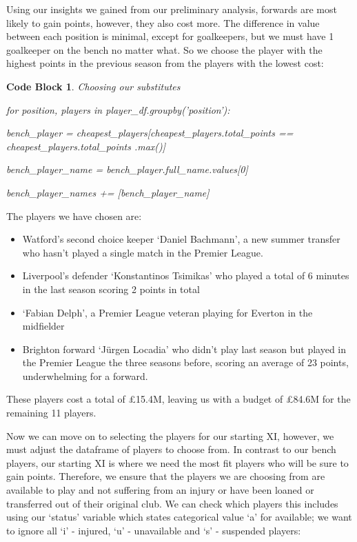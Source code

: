\documentclass[12pt, a4paper, oneside]{book}
\newtheorem{codeblock}[theorem]{Code Block}
\numberwithin{equation}{section}
\begin{document}
Using our insights we gained from our preliminary analysis, forwards are most likely to gain points, however, they also cost more. The difference in value between each position is minimal, except for goalkeepers, but we must have 1 goalkeeper on the bench no matter what. So we choose the player with the highest points in the previous season from the players with the lowest cost:

\begin{codeblock}
  Choosing our substitutes

  for position, players in player\_df.groupby('position'):

  bench\_player = cheapest\_players[cheapest\_players.total\_points == cheapest\_players.total\_points .max()]
  
  bench\_player\_name = bench\_player.full\_name.values[0]
  
  bench\_player\_names += [bench\_player\_name]

\end{codeblock}

The players we have chosen are:

\begin{itemize}
  \item Watford's second choice keeper `Daniel Bachmann', a new summer transfer who hasn't played a single match in the Premier League.
  \item Liverpool's defender `Konstantinos Tsimikas' who played a total of 6 minutes in the last season scoring 2 points in total
  \item `Fabian Delph', a Premier League veteran playing for Everton in the midfielder
  \item Brighton forward `Jürgen Locadia' who didn't play last season but played in the Premier League the three seasons before, scoring an average of 23 points, underwhelming for a forward.
\end{itemize}

These players cost a total of £15.4M, leaving us with a budget of £84.6M for the remaining 11 players.

\vspace{0.5cm}

Now we can move on to selecting the players for our starting XI, however, we must adjust the dataframe of players to choose from. In contrast to our bench players, our starting XI is where we need the most fit players who will be sure to gain points. Therefore, we ensure that the players we are choosing from are available to play and not suffering from an injury or have been loaned or transferred out of their original club. We can check which players this includes using our `status' variable which states categorical value `a' for available; we want to ignore all `i' - injured, `u' - unavailable and `s' - suspended players:
\end{document}
